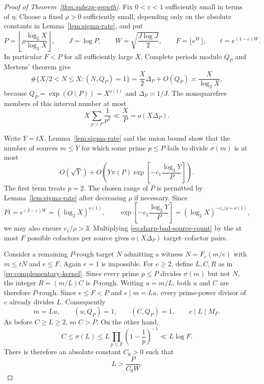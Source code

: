 \documentclass[11pt]{article}
\theoremstyle{remark}
\newcommand{\1}{\mathbf 1}
\begin{document}
\begin{proof}[Proof of Theorem~\ref{thm:subexp-growth}]
Fix $0<\varepsilon<1$ sufficiently small in terms of $\eta$.  Choose a fixed
$\rho>0$ sufficiently small, depending only on the absolute constants in
Lemma~\ref{lem:sigma-rate}, and put
\[
 P=\left\lfloor\rho\frac{\log_2X}{\log_3X}\right\rfloor,
 \qquad J=\log P,
 \qquad W=\sqrt{\frac{J\log J}{2}},
 \qquad F=\lfloor e^W\rfloor,
 \qquad t=e^{(1-\varepsilon)W}.
\]
In particular $F<P$ for all sufficiently large $X$.  Complete periods modulo
$Q_P$ and Mertens' theorem give
\begin{equation}\label{eq:sharp-rough-target-count}
 \#\{X/2<N\leq X:(N,Q_P)=1\}
 =\frac X2\Delta_P+O(Q_P)
 \asymp\frac X{\log_3X},
\end{equation}
because $Q_P=\exp(O(P))=X^{o(1)}$ and $\Delta_P\asymp1/J$.  The
nonsquarefree members of this interval number at most
\[
 X\sum_{p>P}\frac1{p^2}\ll\frac XP=o(X\Delta_P).
\]

Write $Y=tX$.  Lemma~\ref{lem:sigma-rate} and the union bound show that the
number of sources $m\leq Y$ for which some prime $p\leq P$ fails to divide
$\sigma(m)$ is at most
\begin{equation}\label{eq:sharp-bad-source-count}
 O(\sqrt Y)+O\left(
      Y\pi(P)\exp\left[-c_1\frac{\log_2Y}{P}\right]
    \right).
\end{equation}
The first term treats $p=2$.  The chosen range of $P$ is permitted by
Lemma~\ref{lem:sigma-rate} after decreasing $\rho$ if necessary.  Since
\[
 Ft=e^{(2-\varepsilon)W}=(\log_2X)^{o(1)},
 \qquad
 \exp\left[-c_1\frac{\log_2Y}{P}\right]
      =(\log_2X)^{-c_1/\rho+o(1)},
\]
we may also ensure $c_1/\rho>3$.  Multiplying
\eqref{eq:sharp-bad-source-count} by the at most $F$ possible cofactors per
source gives $o(X\Delta_P)$ target--cofactor pairs.

Consider a remaining $P$-rough target $N$ admitting a witness
$N=F_e(m/e)$ with $m\leq tN$ and $e\leq F$.  Again $e=1$ is impossible.
For $e\geq2$, define $L,C,R$ as in \eqref{eq:complementary-kernel}.  Since
every prime $p\leq P$ divides $\sigma(m)$ but not $N$, the integer
$R=(m/L)C$ is $P$-rough.  Writing $u=m/L$, both $u$ and $C$ are therefore
$P$-rough.  Since $e\leq F<P$ and $e\mid m=Lu$, every prime-power divisor
of $e$ already divides $L$.  Consequently
\[
 m=Lu,\qquad (u,Q_P)=1,\qquad (C,Q_P)=1,
 \qquad e\mid L\mid M_F.
\]
As before $C\geq L\geq2$, so $C>P$.  On the other hand,
\[
 C\leq\sigma(L)
 \leq L\prod_{p\leq F}\left(1-\frac1p\right)^{-1}
 \ll L\log F.
\]
There is therefore an absolute constant $C_0>0$ such that
\begin{equation}\label{eq:moving-kernel-lower-bound}
 L>\frac P{C_0W}.
\end{equation}


\end{proof}
\end{document}

